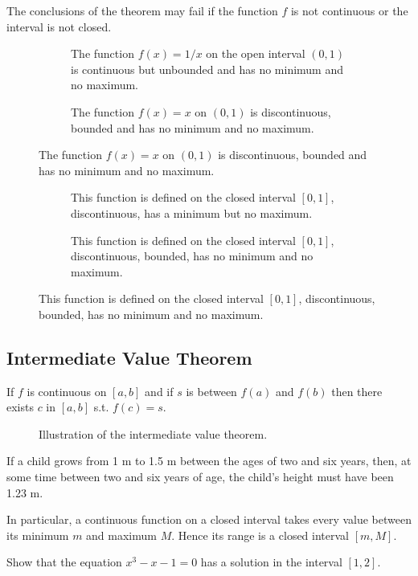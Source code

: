 \documentclass[../calc1-main.tex]{subfiles}
\begin{document}
\begin{example}
	The conclusions of the theorem may fail if the function $f$ is not continuous or the interval is not closed.

	\begin{figure}[H]
		\centering
		\begin{subfigure}[t]{0.4\textwidth}
			
			\caption{The function $f(x) = 1/x$ on the open interval $(0,1)$ is continuous but unbounded and has no minimum and no maximum.}
		\end{subfigure}
		\quad
		\begin{subfigure}[t]{0.4\textwidth}
			
			\caption{The function $f(x) = x$ on $(0,1)$ is discontinuous, bounded and has no minimum and no maximum.}
		\end{subfigure}
	\end{figure}

	\begin{figure}[H]
		\centering
		\begin{subfigure}[t]{0.4\textwidth}
			
			\caption{This function is defined on the closed interval $[0,1]$, discontinuous, has a minimum but no maximum.}
		\end{subfigure}
		\quad
		\begin{subfigure}[t]{0.4\textwidth}
			
			\caption{This function is defined on the closed interval $[0,1]$, discontinuous, bounded, has no minimum and no maximum.}
		\end{subfigure}
	\end{figure}
\end{example}

\subsection*{Intermediate Value Theorem}
\begin{theorem}
	If $f$ is continuous on $[a, b]$ and if $s$ is between $f(a)$ and $f(b)$ then there exists $c$ in $[a, b]$ s.t. $f(c) = s$.
\end{theorem}

\begin{figure}[H]
	\centering
	
	\caption{Illustration of the intermediate value theorem.}
\end{figure}

\begin{example}
	If a child grows from 1 m to 1.5 m between the ages of two and six years, then, at some time between two and six years of age, the child's height must have been 1.23 m.
\end{example}
In particular, a continuous function on a closed interval takes every value between its minimum $m$ and maximum $M$. Hence its range is a closed interval $[m, M]$.
\begin{example}
	Show that the equation $x^3 - x - 1 = 0$ has a solution in the interval $[1, 2]$.
\end{example}
\end{document}
